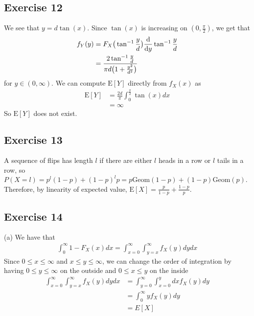 \subsection{Exercise 12}
We see that $y = d \tan(x)$. Since $\tan(x)$ is increasing on $(0, \frac{\pi}{2})$, we get that
\begin{align*}
        f_Y(y) &= F_X\big(\tan^{-1} \frac{y}{d}\big) \dv{y} \tan^{-1} \frac{y}{d} \\
               &= \frac{2\tan^{-1} \frac{y}{d}}{\pi d\big(1 + \frac{y^2}{d^2}\big)}
\end{align*}
for $y \in (0, \infty)$. We can compute $\mathrm{E} [Y]$ directly from $f_X(x)$ as
\begin{align*}
        \mathrm{E} [Y] &= \frac{2d}{\pi}\int_{0}^{\frac{\pi }{2}} \tan(x) dx \\
                       &= \infty
\end{align*}
So $\mathrm{E} [Y]$ does not exist.

\subsection{Exercise 13}
A sequence of flips has length $l$ if there are either $l$ heads in a row or $l$ tails in a row, so
$P(X = l) = p^l (1 - p) + (1 - p)^l p = p \text{Geom}(1 - p) + (1 - p) \text{Geom}(p)$. Therefore,
by linearity of expected value, $\mathrm{E} [X] = \frac{p}{1 - p} + \frac{1 - p}{p}$.

\subsection{Exercise 14}
(a) We have that
\begin{align*}
        \int_{0}^{\infty} 1 - F_X(x) dx = \int_{x = 0}^{\infty} \int_{y = x}^{\infty} f_X(y) dy dx  
\end{align*}
Since $0 \leq x \leq \infty$ and $x \leq y \leq \infty$, we can change the order of integration by having
$0 \leq y \leq \infty$ on the outside and $0 \leq x \leq y$ on the inside
\begin{align*}
        \int_{x = 0}^{\infty} \int_{y = x}^{\infty} f_X(y) dy dx &= \int_{y = 0}^{\infty} \int_{x = 0}^{y} dx f_X(y) dy \\
                                                                 &= \int_{0}^{\infty} y f_X(y) dy \\
                                                                 &= E[X]
\end{align*}


